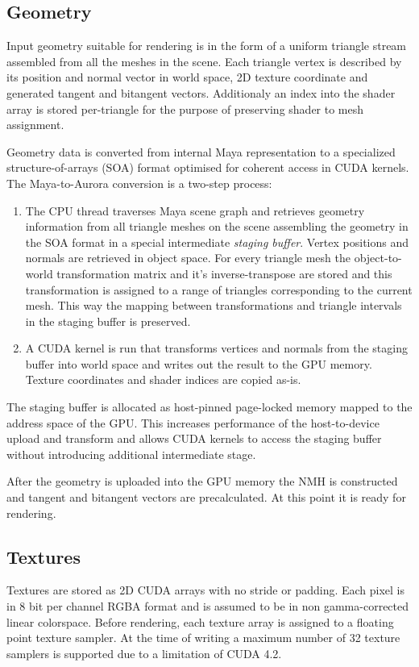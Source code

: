 \subsection{Geometry}
Input geometry suitable for rendering is in the form of a uniform triangle stream assembled from all the meshes in the scene. Each triangle vertex is described by its position and normal vector in world space, 2D texture coordinate and generated tangent and bitangent vectors. Additionaly an index into the shader array is stored per-triangle for the purpose of preserving shader to mesh assignment.

Geometry data is converted from internal Maya representation to a specialized structure-of-arrays (SOA) format optimised for coherent access in CUDA kernels. The Maya-to-Aurora conversion is a two-step process:
\begin{enumerate}
\item The CPU thread traverses Maya scene graph and retrieves geometry information from all triangle meshes on the scene assembling the geometry in the SOA format in a special intermediate \emph{staging buffer}. Vertex positions and normals are retrieved in object space. For every triangle mesh the object-to-world transformation matrix and it's inverse-transpose are stored and this transformation is assigned to a range of triangles corresponding to the current mesh. This way the mapping between transformations and triangle intervals in the staging buffer is preserved.
\item A CUDA kernel is run that transforms vertices and normals from the staging buffer into world space and writes out the result to the GPU memory. Texture coordinates and shader indices are copied as-is.
\end{enumerate}
The staging buffer is allocated as host-pinned page-locked memory mapped to the address space of the GPU. This increases performance of the host-to-device upload and transform and allows CUDA kernels to access the staging buffer without introducing additional intermediate stage.

After the geometry is uploaded into the GPU memory the NMH is constructed and tangent and bitangent vectors are precalculated. At this point it is ready for rendering.

\subsection{Textures}
Textures are stored as 2D CUDA arrays with no stride or padding. Each pixel is in 8 bit per channel RGBA format and is assumed to be in non gamma-corrected linear colorspace. Before rendering, each texture array is assigned to a floating point texture sampler. At the time of writing a maximum number of 32 texture samplers is supported due to a limitation of CUDA 4.2.

